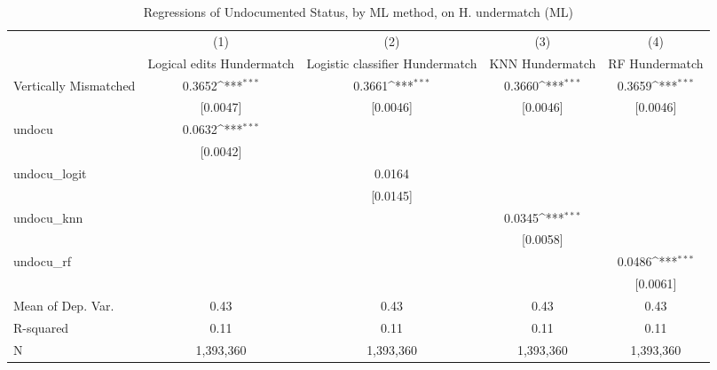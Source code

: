 \begin{table}[htbp]\centering
\def\sym#1{\ifmmode^{#1}\else\(^{#1}\)\fi}
\caption{Regressions of Undocumented Status, by ML method, on H. undermatch (ML)}
\begin{tabular}{l*{4}{c}}
\toprule
                    &\multicolumn{1}{c}{(1)}         &\multicolumn{1}{c}{(2)}         &\multicolumn{1}{c}{(3)}         &\multicolumn{1}{c}{(4)}         \\
                    &Logical edits Hundermatch         &Logistic classifier Hundermatch         &KNN Hundermatch         &RF Hundermatch         \\
\midrule
Vertically Mismatched&      0.3652\sym{***}&      0.3661\sym{***}&      0.3660\sym{***}&      0.3659\sym{***}\\
                    &    [0.0047]         &    [0.0046]         &    [0.0046]         &    [0.0046]         \\
\addlinespace
undocu              &      0.0632\sym{***}&                     &                     &                     \\
                    &    [0.0042]         &                     &                     &                     \\
\addlinespace
undocu\_logit        &                     &      0.0164         &                     &                     \\
                    &                     &    [0.0145]         &                     &                     \\
\addlinespace
undocu\_knn          &                     &                     &      0.0345\sym{***}&                     \\
                    &                     &                     &    [0.0058]         &                     \\
\addlinespace
undocu\_rf           &                     &                     &                     &      0.0486\sym{***}\\
                    &                     &                     &                     &    [0.0061]         \\
\midrule
Mean of Dep. Var.   &        0.43         &        0.43         &        0.43         &        0.43         \\
R-squared           &        0.11         &        0.11         &        0.11         &        0.11         \\
N                   &   1,393,360         &   1,393,360         &   1,393,360         &   1,393,360         \\

\end{tabular}
\end{table}
